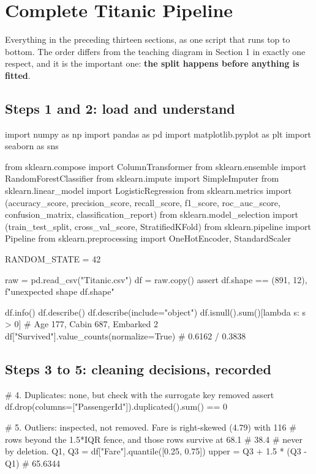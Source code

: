\documentclass[11pt,a4paper]{article}
\begin{document}
\newpage
\section{Complete Titanic Pipeline}

Everything in the preceding thirteen sections, as one script that runs top to bottom. The
order differs from the teaching diagram in Section 1 in exactly one respect, and it is the
important one: \textbf{the split happens before anything is fitted}.


\subsection{Steps 1 and 2: load and understand}

\begin{py}
import numpy as np
import pandas as pd
import matplotlib.pyplot as plt
import seaborn as sns

from sklearn.compose import ColumnTransformer
from sklearn.ensemble import RandomForestClassifier
from sklearn.impute import SimpleImputer
from sklearn.linear_model import LogisticRegression
from sklearn.metrics import (accuracy_score, precision_score, recall_score,
                             f1_score, roc_auc_score, confusion_matrix,
                             classification_report)
from sklearn.model_selection import (train_test_split, cross_val_score,
                                     StratifiedKFold)
from sklearn.pipeline import Pipeline
from sklearn.preprocessing import OneHotEncoder, StandardScaler

RANDOM_STATE = 42

raw = pd.read_csv("Titanic.csv")
df  = raw.copy()
assert df.shape == (891, 12), f"unexpected shape {df.shape}"

df.info()
df.describe()
df.describe(include="object")
df.isnull().sum()[lambda s: s > 0]     # Age 177, Cabin 687, Embarked 2
df["Survived"].value_counts(normalize=True)   # 0.6162 / 0.3838
\end{py}

\subsection{Steps 3 to 5: cleaning decisions, recorded}

\begin{py}
# 4. Duplicates: none, but check with the surrogate key removed
assert df.drop(columns=["PassengerId"]).duplicated().sum() == 0

# 5. Outliers: inspected, not removed. Fare is right-skewed (4.79) with 116
#    rows beyond the 1.5*IQR fence, and those rows survive at 68.1%
#    38.4%
#    never by deletion.
Q1, Q3 = df["Fare"].quantile([0.25, 0.75])
upper  = Q3 + 1.5 * (Q3 - Q1)          # 65.6344
\end{py}
\end{document}

